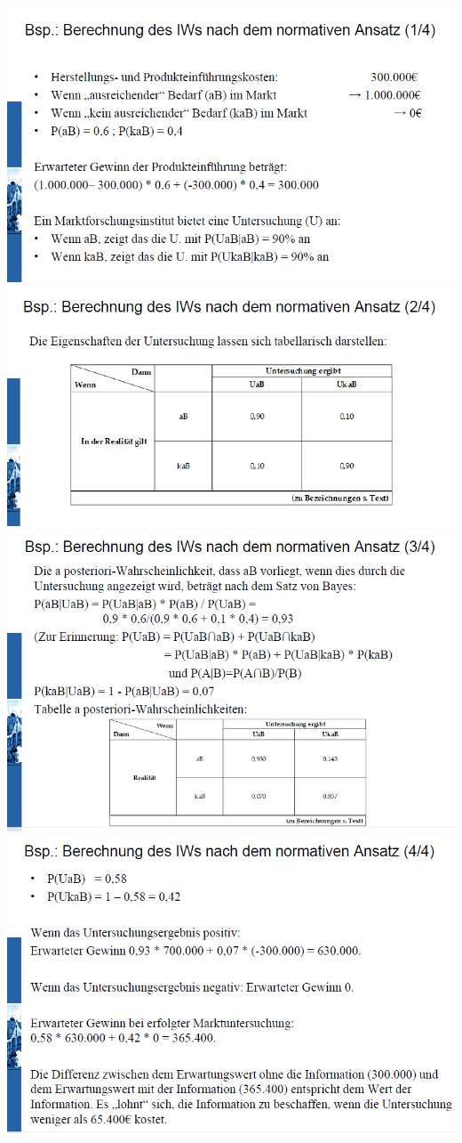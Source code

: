 \documentclass[]{article}
\begin{document}
\includegraphics{img/Nansatz1.png} \includegraphics{img/Nansatz2.png}
\includegraphics{img/Nansatz3.png} \includegraphics{img/Nansatz4.png}
\end{document}
